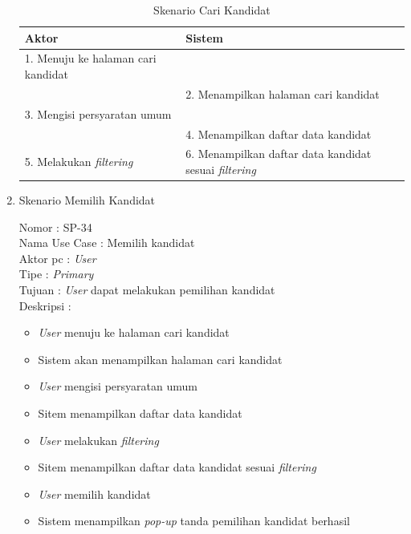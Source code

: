 \begin{enumerate}
\begin{itemize}
\end{itemize}

\begin{table}
	\caption{Skenario Cari Kandidat}
	\centering
	\begin{tabular}{ | l | p{67.5mm}|}
		\hline 
		\textbf{Aktor} & \textbf{Sistem} \\
		\hline
		
		1.	Menuju ke halaman cari kandidat &  \\
		
		\hline
		
		&  2.	Menampilkan halaman cari kandidat \\
		
		\hline
		
		3. Mengisi persyaratan umum & \\
		
		\hline
		
		& 4. Menampilkan daftar data kandidat \\
		\hline
		
		5. Melakukan \textit{filtering}
		
		& 6. Menampilkan daftar data kandidat sesuai \textit{filtering} \\
		\hline
		
	\end{tabular}
\end{table}

\item Skenario Memilih Kandidat

Nomor \kern 3.6pc : SP-34 \\
Nama Use Case : Memilih kandidat \\
Aktor  pc : \textit{User} \\
Tipe \kern 4.6pc : \textit{Primary} \\
Tujuan \kern 3.6pc : \textit{User} dapat melakukan pemilihan kandidat \\
Deskripsi \kern 2.5pc : 

\begin{itemize}
	\item \textit{User} menuju ke halaman cari kandidat
	\item Sistem akan menampilkan halaman cari kandidat
	\item \textit{User} mengisi persyaratan umum
	\item Sitem menampilkan daftar data kandidat
	\item \textit{User} melakukan \textit{filtering}
	\item Sitem menampilkan daftar data kandidat sesuai \textit{filtering}
	\item \textit{User} memilih kandidat
	\item Sistem menampilkan \textit{pop-up} tanda pemilihan kandidat berhasil
	

\end{itemize}
\end{enumerate}
